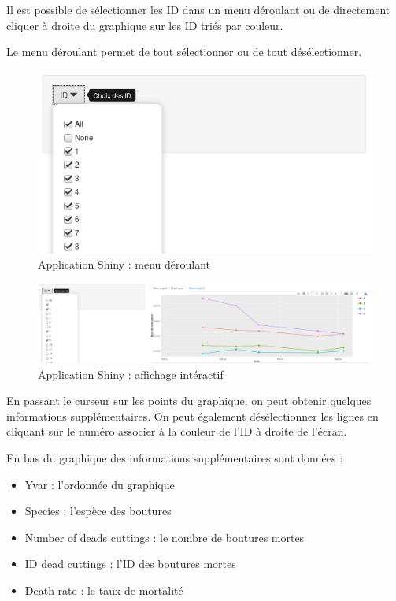 \documentclass[]{report}
\providecommand{\tightlist}{%
  \setlength{\itemsep}{0pt}\setlength{\parskip}{0pt}}
\begin{document}
\null
\newpage

Il est possible de sélectionner les ID dans un menu déroulant ou de
directement cliquer à droite du graphique sur les ID triés par couleur.

Le menu déroulant permet de tout sélectionner ou de tout désélectionner.

\begin{figure}[h!]
\includegraphics[]{../image/shiny4.PNG}
\caption{Application Shiny : menu déroulant}
\end{figure}

\begin{figure}[h!]
\includegraphics[]{../image/shiny5.PNG}
\caption{Application Shiny : affichage intéractif}
\end{figure}

En passant le curseur sur les points du graphique, on peut obtenir
quelques informations supplémentaires. On peut également désélectionner
les lignes en cliquant sur le numéro associer à la couleur de l'ID à
droite de l'écran.

En bas du graphique des informations supplémentaires sont données :

\begin{itemize}
\tightlist
\item
  Yvar : l'ordonnée du graphique
\item
  Species : l'espèce des boutures
\item
  Number of deads cuttings : le nombre de boutures mortes
\item
  ID dead cuttings : l'ID des boutures mortes
\item
  Death rate : le taux de mortalité
\end{itemize}
\end{document}
